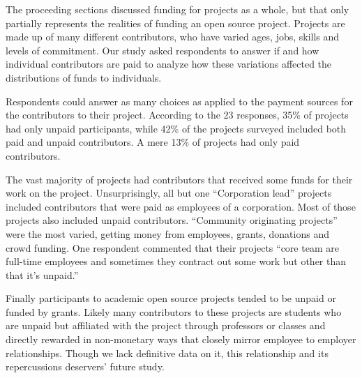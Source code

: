 
The proceeding sections discussed funding for projects as a whole, but that only partially represents the realities of funding an open source project. Projects are made up of many different contributors, who have varied ages, jobs, skills and levels of commitment. Our study asked respondents to answer if and how individual contributors are paid to analyze how these variations affected the distributions of funds to individuals. 

Respondents could answer as many choices as applied to the payment sources for the contributors to their project. According to the 23 responses, 35\% of projects had only unpaid participants, while 42\% of the projects surveyed included both paid and unpaid contributors. A mere 13\% of projects had only paid contributors.

The vast majority of projects had contributors that received some funds for their work on the project. Unsurprisingly, all but one “Corporation lead” projects included contributors that were paid as employees of a corporation. Most of those projects also included unpaid contributors. “Community  originating projects” were the most varied, getting money from employees, grants, donations and crowd funding. One respondent commented that their projects “core team are full-time employees and sometimes they contract out some work but other than that it's unpaid.”

Finally participants to academic open source projects tended to be unpaid or funded by grants. Likely many contributors to these projects are students who are unpaid but affiliated with the project through professors or classes and directly rewarded in non-monetary ways that closely mirror employee to employer relationships. Though we lack definitive data on it, this relationship and its repercussions deservers’ future study.